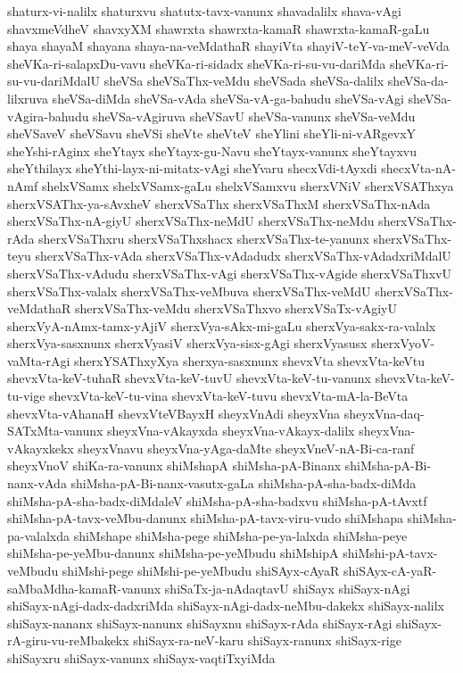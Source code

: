 {shaturx-vi-nalilx
shaturxvu
shatutx-tavx-vanunx
shavadalilx
shava-vAgi
shavxmeVdheV
shavxyXM
shawrxta
shawrxta-kamaR
shawrxta-kamaR-gaLu
shaya
shayaM
shayana
shaya-na-veMdathaR
shayiVta
shayiV-teY-va-meV-veVda
sheVKa-ri-salapxDu-vavu
sheVKa-ri-sidadx
sheVKa-ri-su-vu-dariMda
sheVKa-ri-su-vu-dariMdalU
sheVSa
sheVSaThx-veMdu
sheVSada
sheVSa-dalilx
sheVSa-da-lilxruva
sheVSa-diMda
sheVSa-vAda
sheVSa-vA-ga-bahudu
sheVSa-vAgi
sheVSa-vAgira-bahudu
sheVSa-vAgiruva
sheVSavU
sheVSa-vanunx
sheVSa-veMdu
sheVSaveV
sheVSavu
sheVSi
sheVte
sheVteV
sheYlini
sheYli-ni-vARgevxY
sheYshi-rAginx
sheYtayx
sheYtayx-gu-Navu
sheYtayx-vanunx
sheYtayxvu
sheYthilayx
sheYthi-layx-ni-mitatx-vAgi
sheYvaru
shecxVdi-tAyxdi
shecxVta-nA-nAmf
shelxVSamx
shelxVSamx-gaLu
shelxVSamxvu
sherxVNiV
sherxVSAThxya
sherxVSAThx-ya-sAvxheV
sherxVSaThx
sherxVSaThxM
sherxVSaThx-nAda
sherxVSaThx-nA-giyU
sherxVSaThx-neMdU
sherxVSaThx-neMdu
sherxVSaThx-rAda
sherxVSaThxru
sherxVSaThxshacx
sherxVSaThx-te-yanunx
sherxVSaThx-teyu
sherxVSaThx-vAda
sherxVSaThx-vAdadudx
sherxVSaThx-vAdadxriMdalU
sherxVSaThx-vAdudu
sherxVSaThx-vAgi
sherxVSaThx-vAgide
sherxVSaThxvU
sherxVSaThx-valalx
sherxVSaThx-veMbuva
sherxVSaThx-veMdU
sherxVSaThx-veMdathaR
sherxVSaThx-veMdu
sherxVSaThxvo
sherxVSaTx-vAgiyU
sherxVyA-nAmx-tamx-yAjiV
sherxVya-sAkx-mi-gaLu
sherxVya-sakx-ra-valalx
sherxVya-sasxnunx
sherxVyasiV
sherxVya-sisx-gAgi
sherxVyasusx
sherxVyoV-vaMta-rAgi
sherxYSAThxyXya
sherxya-sasxnunx
shevxVta
shevxVta-keVtu
shevxVta-keV-tuhaR
shevxVta-keV-tuvU
shevxVta-keV-tu-vanunx
shevxVta-keV-tu-vige
shevxVta-keV-tu-vina
shevxVta-keV-tuvu
shevxVta-mA-la-BeVta
shevxVta-vAhanaH
shevxVteVBayxH
sheyxVnAdi
sheyxVna
sheyxVna-daq-SATxMta-vanunx
sheyxVna-vAkayxda
sheyxVna-vAkayx-dalilx
sheyxVna-vAkayxkekx
sheyxVnavu
sheyxVna-yAga-daMte
sheyxVneV-nA-Bi-ca-ranf
sheyxVnoV
shiKa-ra-vanunx
shiMshapA
shiMsha-pA-Binanx
shiMsha-pA-Bi-nanx-vAda
shiMsha-pA-Bi-nanx-vasutx-gaLa
shiMsha-pA-sha-badx-diMda
shiMsha-pA-sha-badx-diMdaleV
shiMsha-pA-sha-badxvu
shiMsha-pA-tAvxtf
shiMsha-pA-tavx-veMbu-danunx
shiMsha-pA-tavx-viru-vudo
shiMshapa
shiMsha-pa-valalxda
shiMshape
shiMsha-pege
shiMsha-pe-ya-lalxda
shiMsha-peye
shiMsha-pe-yeMbu-danunx
shiMsha-pe-yeMbudu
shiMshipA
shiMshi-pA-tavx-veMbudu
shiMshi-pege
shiMshi-pe-yeMbudu
shiSAyx-cAyaR
shiSAyx-cA-yaR-saMbaMdha-kamaR-vanunx
shiSaTx-ja-nAdaqtavU
shiSayx
shiSayx-nAgi
shiSayx-nAgi-dadx-dadxriMda
shiSayx-nAgi-dadx-neMbu-dakekx
shiSayx-nalilx
shiSayx-nananx
shiSayx-nanunx
shiSayxnu
shiSayx-rAda
shiSayx-rAgi
shiSayx-rA-giru-vu-reMbakekx
shiSayx-ra-neV-karu
shiSayx-ranunx
shiSayx-rige
shiSayxru
shiSayx-vanunx
shiSayx-vaqtiTxyiMda
}
